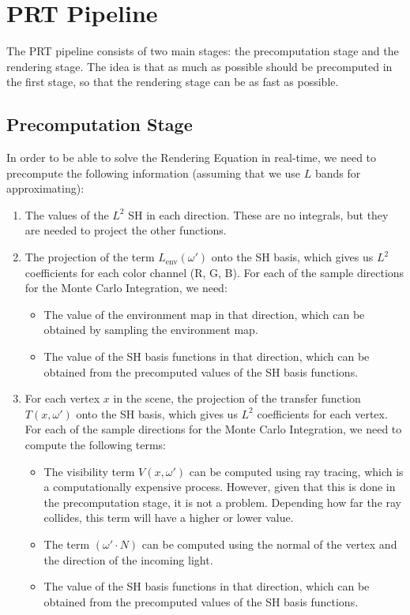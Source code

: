 \section{PRT Pipeline}

The PRT pipeline consists of two main stages: the precomputation stage and the rendering stage. The idea is that as much as possible should be precomputed in the first stage, so that the rendering stage can be as fast as possible.

\subsection{Precomputation Stage}

In order to be able to solve the Rendering Equation in real-time, we need to precompute the following information (assuming that we use $L$ bands for approximating):
\begin{enumerate}
    \item The values of the $L^2$ SH in each direction. These are no integrals, but they are needed to project the other functions.
    \item The projection of the term $L_{\text{env}}(\omega')$ onto the SH basis, which gives us $L^2$ coefficients for each color channel (R, G, B). For each of the sample directions for the Monte Carlo Integration, we need:
    \begin{itemize}
        \item The value of the environment map in that direction, which can be obtained by sampling the environment map.
        \item The value of the SH basis functions in that direction, which can be obtained from the precomputed values of the SH basis functions.
    \end{itemize}
    \item For each vertex $x$ in the scene, the projection of the transfer function $T(x, \omega')$ onto the SH basis, which gives us $L^2$ coefficients for each vertex. For each of the sample directions for the Monte Carlo Integration, we need to compute the following terms:
    \begin{itemize}
        \item The visibility term $V(x, \omega')$ can be computed using ray tracing, which is a computationally expensive process. However, given that this is done in the precomputation stage, it is not a problem. Depending how far the ray collides, this term will have a higher or lower value.
        \item The term $(\omega' \cdot N)$ can be computed using the normal of the vertex and the direction of the incoming light.
        \item The value of the SH basis functions in that direction, which can be obtained from the precomputed values of the SH basis functions.
    \end{itemize}
\end{enumerate}

